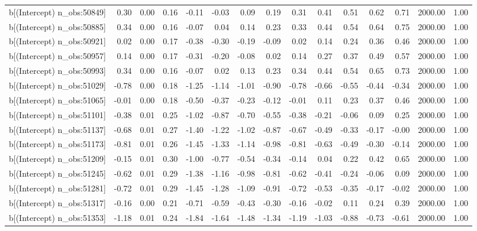 \begin{table}[ht]
\begin{tabular}{rrrrrrrrrrrrrrr}
  b[(Intercept) n\_obs:50849] & 0.30 & 0.00 & 0.16 & -0.11 & -0.03 & 0.09 & 0.19 & 0.31 & 0.41 & 0.51 & 0.62 & 0.71 & 2000.00 & 1.00 \\ 
  b[(Intercept) n\_obs:50885] & 0.34 & 0.00 & 0.16 & -0.07 & 0.04 & 0.14 & 0.23 & 0.33 & 0.44 & 0.54 & 0.64 & 0.75 & 2000.00 & 1.00 \\ 
  b[(Intercept) n\_obs:50921] & 0.02 & 0.00 & 0.17 & -0.38 & -0.30 & -0.19 & -0.09 & 0.02 & 0.14 & 0.24 & 0.36 & 0.46 & 2000.00 & 1.00 \\ 
  b[(Intercept) n\_obs:50957] & 0.14 & 0.00 & 0.17 & -0.31 & -0.20 & -0.08 & 0.02 & 0.14 & 0.27 & 0.37 & 0.49 & 0.57 & 2000.00 & 1.00 \\ 
  b[(Intercept) n\_obs:50993] & 0.34 & 0.00 & 0.16 & -0.07 & 0.02 & 0.13 & 0.23 & 0.34 & 0.44 & 0.54 & 0.65 & 0.73 & 2000.00 & 1.00 \\ 
  b[(Intercept) n\_obs:51029] & -0.78 & 0.00 & 0.18 & -1.25 & -1.14 & -1.01 & -0.90 & -0.78 & -0.66 & -0.55 & -0.44 & -0.34 & 2000.00 & 1.00 \\ 
  b[(Intercept) n\_obs:51065] & -0.01 & 0.00 & 0.18 & -0.50 & -0.37 & -0.23 & -0.12 & -0.01 & 0.11 & 0.23 & 0.37 & 0.46 & 2000.00 & 1.00 \\ 
  b[(Intercept) n\_obs:51101] & -0.38 & 0.01 & 0.25 & -1.02 & -0.87 & -0.70 & -0.55 & -0.38 & -0.21 & -0.06 & 0.09 & 0.25 & 2000.00 & 1.00 \\ 
  b[(Intercept) n\_obs:51137] & -0.68 & 0.01 & 0.27 & -1.40 & -1.22 & -1.02 & -0.87 & -0.67 & -0.49 & -0.33 & -0.17 & -0.00 & 2000.00 & 1.00 \\ 
  b[(Intercept) n\_obs:51173] & -0.81 & 0.01 & 0.26 & -1.45 & -1.33 & -1.14 & -0.98 & -0.81 & -0.63 & -0.49 & -0.30 & -0.14 & 2000.00 & 1.00 \\ 
  b[(Intercept) n\_obs:51209] & -0.15 & 0.01 & 0.30 & -1.00 & -0.77 & -0.54 & -0.34 & -0.14 & 0.04 & 0.22 & 0.42 & 0.65 & 2000.00 & 1.00 \\ 
  b[(Intercept) n\_obs:51245] & -0.62 & 0.01 & 0.29 & -1.38 & -1.16 & -0.98 & -0.81 & -0.62 & -0.41 & -0.24 & -0.06 & 0.09 & 2000.00 & 1.00 \\ 
  b[(Intercept) n\_obs:51281] & -0.72 & 0.01 & 0.29 & -1.45 & -1.28 & -1.09 & -0.91 & -0.72 & -0.53 & -0.35 & -0.17 & -0.02 & 2000.00 & 1.00 \\ 
  b[(Intercept) n\_obs:51317] & -0.16 & 0.00 & 0.21 & -0.71 & -0.59 & -0.43 & -0.30 & -0.16 & -0.02 & 0.11 & 0.24 & 0.39 & 2000.00 & 1.00 \\ 
  b[(Intercept) n\_obs:51353] & -1.18 & 0.01 & 0.24 & -1.84 & -1.64 & -1.48 & -1.34 & -1.19 & -1.03 & -0.88 & -0.73 & -0.61 & 2000.00 & 1.00 \\ 

\end{tabular}
\end{table}
